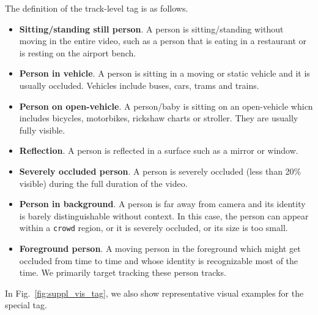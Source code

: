 \documentclass[runningheads]{llncs}
\begin{document}
The definition of the track-level tag is as follows.
\begin{itemize}
    \item \textbf{Sitting/standing still person}. A person is sitting/standing without moving in the entire video, such as a person that is eating in a restaurant or is resting on the airport bench.
    \item \textbf{Person in vehicle}. A person is sitting in a moving or static vehicle and it is usually occluded.  Vehicles include buses, cars, trams and trains. 
    \item \textbf{Person on open-vehicle}. A person/baby is sitting on an open-vehicle whicn includes bicycles, motorbikes, rickshaw charts or stroller. They are usually fully visible.
    \item \textbf{Reflection}. A person is reflected in a surface such as a mirror or window.
    \item \textbf{Severely occluded person}. A person is severely occluded (less than 20\% visible) during the full duration of the video.
    \item \textbf{Person in background}. A person is  far away from camera and its identity is barely distinguishable without context. In this case, the person can appear within a \texttt{crowd} region, or it is severely occluded, or its size is too small.  
\item \textbf{Foreground person}. A moving person in the foreground which might get occluded from time to time and whose identity is recognizable most of the time. We primarily target tracking these person tracks. \end{itemize}

In Fig.~\ref{fig:suppl_vis_tag}, we also show representative visual examples for the special tag.
\end{document}
